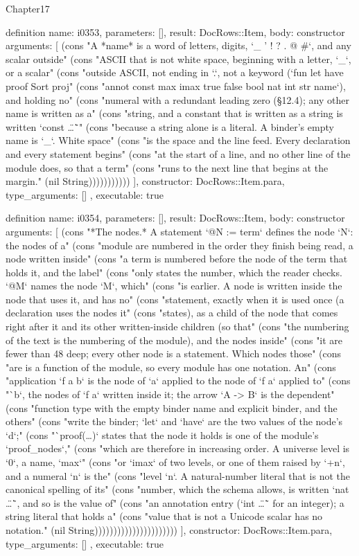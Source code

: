 \begin{lexlean}{Chapter17}
\begin{semanticmodule}
definition{
  name: i0353,
  parameters: [],
  result: DocRows::Item,
  body: constructor{
    arguments: [
      (cons "A *name* is a word of letters, digits, `_ ' ! ? . @ #`, and any scalar outside" (cons "ASCII that is not white space, beginning with a letter, `_`, or a scalar" (cons "outside ASCII, not ending in `.`, not a keyword (`fun let have proof Sort proj" (cons "annot const max imax true false bool nat int str name`), and holding no" (cons "numeral with a redundant leading zero (§12.4); any other name is written as a" (cons "string, and a constant that is written as a string is written `const \"…\"`" (cons "because a string alone is a literal. A binder's empty name is `_`. White space" (cons "is the space and the line feed. Every declaration and every statement begins" (cons "at the start of a line, and no other line of the module does, so that a term" (cons "runs to the next line that begins at the margin." (nil String)))))))))))
    ],
    constructor: DocRows::Item.para,
    type_arguments: []
  },
  executable: true
}

definition{
  name: i0354,
  parameters: [],
  result: DocRows::Item,
  body: constructor{
    arguments: [
      (cons "*The nodes.* A statement `@N := term` defines the node `N`: the nodes of a" (cons "module are numbered in the order they finish being read, a node written inside" (cons "a term is numbered before the node of the term that holds it, and the label" (cons "only states the number, which the reader checks. `@M` names the node `M`, which" (cons "is earlier. A node is written inside the node that uses it, and has no" (cons "statement, exactly when it is used once (a declaration uses the nodes it" (cons "states), as a child of the node that comes right after it and its other written-inside children (so that" (cons "the numbering of the text is the numbering of the module), and the nodes inside" (cons "it are fewer than 48 deep; every other node is a statement. Which nodes those" (cons "are is a function of the module, so every module has one notation. An" (cons "application `f a b` is the node of `a` applied to the node of `f a` applied to" (cons "`b`, the nodes of `f a` written inside it; the arrow `A -> B` is the dependent" (cons "function type with the empty binder name and explicit binder, and the others" (cons "write the binder; `let` and `have` are the two values of the node's `d`;" (cons "`proof(…)` states that the node it holds is one of the module's `proof_nodes`," (cons "which are therefore in increasing order. A universe level is `0`, a name, `max`" (cons "or `imax` of two levels, or one of them raised by `+n`, and a numeral `n` is the" (cons "level `n`. A natural-number literal that is not the canonical spelling of its" (cons "number, which the schema allows, is written `nat \"…\"`, and so is the value of" (cons "an annotation entry (`int \"…\"` for an integer); a string literal that holds a" (cons "value that is not a Unicode scalar has no notation." (nil String))))))))))))))))))))))
    ],
    constructor: DocRows::Item.para,
    type_arguments: []
  },
  executable: true
}


\end{semanticmodule}
\end{lexlean}

